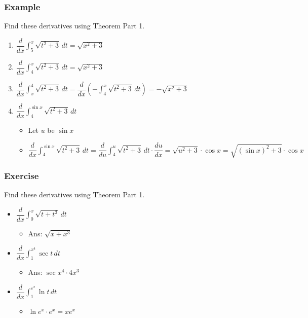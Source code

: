 \documentclass[t]{beamer}
\theoremstyle{plain}
\theoremstyle{definition}
\newcommand{\ds}{\displaystyle}
\begin{document}
\begin{frame}

\frametitle{Example}

\footnotesize

Find these derivatives using Theorem Part 1.


\begin{enumerate}
	\item $\dfrac{d}{dx} \ds\int_{5}^x \sqrt{t^2 + 3}\, dt = \sqrt{x^2 + 3}$
	\item $\dfrac{d}{dx} \ds\int_{4}^x \sqrt{t^2 + 3}\, dt = \sqrt{x^2 + 3}$
	\item $\dfrac{d}{dx} \ds\int_{x}^4 \sqrt{t^2 + 3}\, dt = \dfrac{d}{dx} \left(-\ds\int_{4}^x \sqrt{t^2 + 3}\, dt \right)= -\sqrt{x^2 + 3}$
	\item $\dfrac{d}{dx} \ds\int_{4}^{\sin{x}} \sqrt{t^2 + 3}\, dt$
	\begin{itemize}
		\item Let $u$ be $\sin{x}$
		\item $\dfrac{d}{dx} \ds\int_{4}^{\sin{x}} \sqrt{t^2 + 3}\, dt = \dfrac{d}{du} \ds\int_{4}^{u} \sqrt{t^2 + 3}\, dt \cdot \dfrac{du}{dx} = \sqrt{u^2 + 3}\cdot \cos{x} = \sqrt{(\sin{x})^2 + 3}\cdot \cos{x}$
	\end{itemize}
\end{enumerate}

\end{frame}

\begin{frame}

\frametitle{Exercise}

\footnotesize

Find these derivatives using Theorem Part 1.

\begin{itemize}
	\item $\dfrac{d}{dx} \ds\int_{0}^{x} \sqrt{t + t^3} \,dt $
	\begin{itemize}
		\item Ans: $\sqrt{x + x^3}$
	\end{itemize}
	\item $\dfrac{d}{dx} \ds\int_{1}^{x^4} \sec{t} \,dt $
	\begin{itemize}
		\item Ans: $\sec{x^4} \cdot 4x^3$
	\end{itemize}
	\item $\dfrac{d}{dx} \ds\int_{1}^{e^x} \ln{t} \,dt $
	\begin{itemize}
		\item $ \ln{e^x} \cdot  e^x = xe^x$
	\end{itemize}
\end{itemize}

\end{frame}
\end{document}
